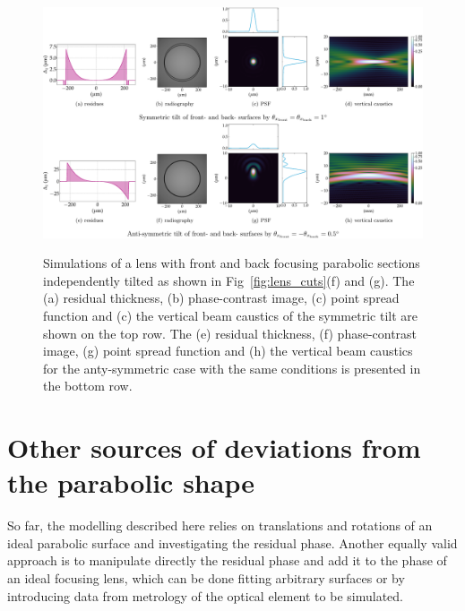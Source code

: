 \begin{refsection}
\begin{figure}[t]
        \centering
        {\includegraphics[width=1.\linewidth]{figures/ch04/tilt_fs_CRL.pdf}}
        \caption[Effects of the tilted parabolic section]{Simulations of a lens with front and back focusing parabolic sections independently tilted as shown in Fig~\ref{fig:lens_cuts}(f) and (g). The (a) residual thickness, (b) phase-contrast image, (c) point spread function and (c) the vertical beam caustics of the symmetric tilt are shown on the top row. The (e) residual thickness, (f) phase-contrast image, (g) point spread function and (h) the vertical beam caustics for the anty-symmetric case with the same conditions is presented in the bottom row.} \label{fig:tilt_fs_CRL}
\end{figure}
\section{Other sources of deviations from the parabolic shape}\label{sec:other_sources}

So far, the modelling described here relies on translations and rotations of an ideal parabolic surface and investigating the residual phase. Another equally valid approach is to manipulate directly the residual phase and add it to the phase of an ideal focusing lens, which can be done fitting arbitrary surfaces or by introducing data from metrology of the optical element to be simulated.


\end{refsection}
